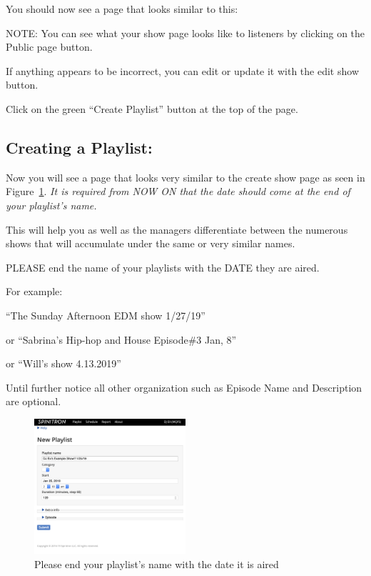 \documentclass[12pt]{article}
\begin{document}
You should now see a page that looks similar to this: 

\hrulefill

NOTE:
You can see what your show page looks like to listeners by clicking on the Public page button.

If anything appears to be incorrect, you can edit or update it with the edit show button.

\hrulefill

Click on the green ``Create Playlist'' button at the top of the page.

\subsection{Creating a Playlist:}
Now you will see a page that looks very similar to the create show page as seen in Figure~\ref{fig12}.
{\it It is required from NOW ON that the date should come at the end of your playlist's name. }

This will help you as well as the managers differentiate between the numerous shows that will accumulate under the same or very similar names.

\hrulefill

PLEASE end the name of your playlists with the DATE they are aired.

For example:

``The Sunday Afternoon EDM show 1/27/19''

or ``Sabrina's Hip-hop and House Episode\#3 Jan, 8''

or ``Will's show 4.13.2019''

\hrulefill

Until further notice all other organization such as Episode Name and Description are optional.

\begin{figure}[H]
    \centering
    \includegraphics[width=0.5\textwidth]{images/New_Playlist_naming_date.png}
    \caption{Please end your playlist's name with the date it is aired}
    \label{fig12}
\end{figure}
\end{document}
